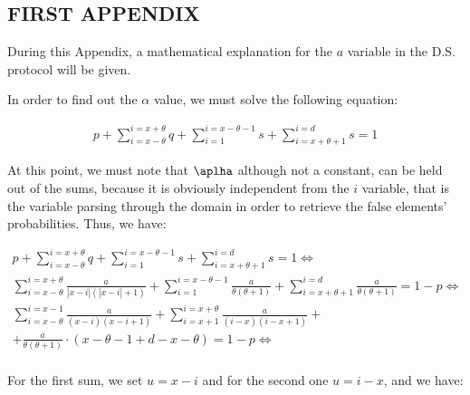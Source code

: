 \documentclass[inscr,ack,preface]{dithesis}
\begin{document}
\begin{appendix}
\appendixstartedtrue

{}

\chapter{FIRST APPENDIX}
During this Appendix, a mathematical explanation for the $a$ variable in the D.S. protocol will be given.

In order to find out the $\alpha$ value, we must solve the following equation:

\begin{align*}
    p + \sum_{i = x - \theta}^{i = x + \theta} q + \sum_{i = 1}^{i = x - \theta -1} s + \sum_{i = x + \theta + 1}^{i = d} s = 1
\end{align*}

At this point, we must note that $\aplha$ although not a constant, can be held out of the sums, because it is obviously independent from the $i$ variable, that is the variable parsing through the domain in order to retrieve the false elements' probabilities. Thus, we have:

\begin{align*}
        p + \sum_{i = x - \theta}^{i = x + \theta} q + \sum_{i = 1}^{i = x - \theta -1} s + \sum_{i = x + \theta + 1}^{i = d} s = 1 \Longleftrightarrow \\
      \sum_{i = x - \theta}^{i = x + \theta} \frac{a}{|x-i|(|x-i| + 1)} + \sum_{i = 1}^{i = x - \theta -1} \frac{a}{\theta(\theta+1)} + \sum_{i = x + \theta + 1}^{i = d} \frac{a}{\theta(\theta+1)} = 1 - p \Longleftrightarrow \\
    \sum_{i = x - \theta}^{i = x - 1} \frac{a}{(x - i)(x - i + 1)} + \sum_{i = x + 1}^{i = x + \theta} \frac{a}{(i - x)(i - x + 1)} +\\+ \frac{a}{\theta(\theta+1)} \cdot (x - \theta - 1 + d - x - \theta) = 1 - p \Longleftrightarrow \\
\end{align*}

For the first sum, we set $u = x - i$ and for the second one $u = i - x$, and we have:


\end{appendix}
\end{document}
